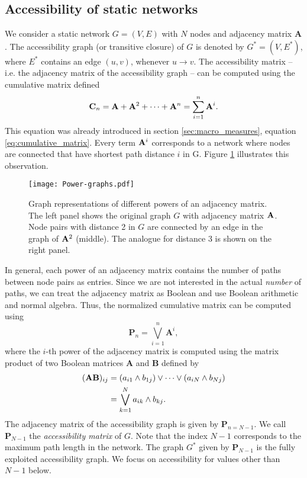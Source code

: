 \subsection{Accessibility of static networks}\label{sec:unfolding_static}
We consider a static network $G=(V,E)$ with $N$ nodes and adjacency matrix $\mathbf{A}$.
The accessibility graph (or transitive closure) of $G$ is denoted by $G^*=(V,E^*)$, where $E^*$ contains an edge $(u,v)$, whenever $u\rightarrow v$.
The accessibility matrix -- i.e. the adjacency matrix of the accessibility graph -- can be computed using the cumulative matrix defined
\begin{equation}\label{eq:cumulative_matrix2}
\mathbf{C}_n=\mathbf{A}+\mathbf{A}^2+\cdots + \mathbf{A}^n = \sum _{i=1} ^n \mathbf{A}^i .
\end{equation}
This equation was already introduced in section \ref{sec:macro_measures}, equation \eqref{eq:cumulative_matrix}.
Every term $\mathbf{A}^i$ corresponds to a network where nodes are connected that have shortest path distance $i$ in G.
Figure \ref{fig:power_graphs} illustrates this observation.
%
\begin{SCfigure}
\texttt{[image: Power-graphs.pdf]}
\caption{Graph representations of different powers of an adjacency matrix.
The left panel shows the original graph $G$ with adjacency matrix $\mathbf{A}$.
Node pairs with distance 2 in $G$ are connected by an edge in the graph of $\mathbf{A}^2$ (middle).
The analogue for distance 3 is shown on the right panel.}
\label{fig:power_graphs}
\end{SCfigure}

In general, each power of an adjacency matrix contains the number of paths between node pairs as entries.
Since we are not interested in the actual \emph{number} of paths, we can treat the adjacency matrix as Boolean and use Boolean arithmetic and normal algebra.
Thus, the normalized cumulative matrix can be computed using
\begin{equation}\label{eq:static_boolean_acc}
\mathbf{P}_{n}=\bigvee _{i=1} ^{n} \mathbf{A}^i ,
\end{equation}
where the $i$-th power of the adjacency matrix is computed using the matrix product of two Boolean matrices $\mathbf{A}$ and $\mathbf{B}$ defined by 
\begin{align}\label{eq:boolean_product}
(\mathbf{A}\mathbf{B})_{ij}&=(a_{i1}\wedge b_{1j})\vee \dots \vee(a_{iN}\wedge b_{Nj}) \nonumber \\
&= \bigvee _{k=1}^N a_{ik} \wedge b_{kj} .
\end{align}
The adjacency matrix of the accessibility graph is given by $\mathbf{P}_{n=N-1}$.
We call $\mathbf{P}_{N-1}$ the \emph{accessibility matrix} of $G$.
Note that the index $N-1$ corresponds to the maximum path length in the network.
The graph $G^*$ given by $\mathbf{P}_{N-1}$ is the fully exploited accessibility graph.
We focus on accessibility for values other than $N-1$ below.

